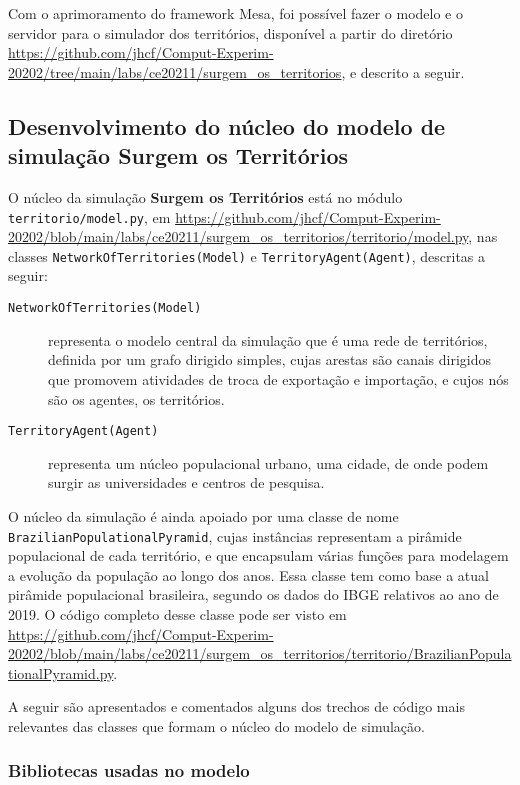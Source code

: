 Com o aprimoramento do framework Mesa, foi possível fazer o modelo e o servidor para o simulador dos territórios, disponível a partir do diretório  \url{https://github.com/jhcf/Comput-Experim-20202/tree/main/labs/ce20211/surgem_os_territorios}, e descrito a seguir.

\subsection{Desenvolvimento do núcleo do modelo de simulação \textbf{Surgem os Territórios}}

O núcleo da simulação \textbf{Surgem os Territórios} está no módulo \texttt{territorio/model.py}, em \url{https://github.com/jhcf/Comput-Experim-20202/blob/main/labs/ce20211/surgem_os_territorios/territorio/model.py}, nas classes \texttt{NetworkOfTerritories(Model)} e \texttt{TerritoryAgent(Agent)}, descritas a seguir:
\begin{description}
\item [\texttt{NetworkOfTerritories(Model)}]
representa o modelo central da simulação que é uma rede de territórios, definida por um grafo dirigido simples, cujas arestas são canais dirigidos que promovem atividades de troca de exportação e importação, e cujos nós são os agentes, os territórios.  
\item [\texttt{TerritoryAgent(Agent)}] representa um núcleo populacional urbano, uma cidade, de onde podem surgir as universidades e centros de pesquisa. 
\end{description}

O núcleo da simulação é ainda apoiado por uma classe de nome \texttt{Brazilian\-Populational\-Pyramid}, cujas instâncias representam a pirâmide populacional de cada território, e que encapsulam várias funções para modelagem a evolução da população ao longo dos anos. Essa classe tem como base a atual pirâmide populacional brasileira, segundo os dados do IBGE relativos ao ano de 2019.
O código completo desse classe pode ser visto em \url{https://github.com/jhcf/Comput-Experim-20202/blob/main/labs/ce20211/surgem_os_territorios/territorio/BrazilianPopulationalPyramid.py}.

A seguir são apresentados e comentados alguns dos trechos de código mais relevantes das classes que formam o núcleo do modelo de simulação.

\subsubsection{Bibliotecas usadas no modelo}



